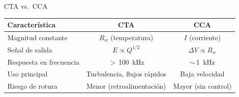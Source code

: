 \documentclass[aspectratio=169,12pt]{beamer}
\begin{document}
\begin{frame}{CTA vs.\ CCA}
	\centering
	\small
	\begin{tabular}{lcc}
		\toprule
		\textbf{Característica} & \textbf{CTA}
		                        & \textbf{CCA}                  \\
		\midrule
		Magnitud constante      & $R_w$ (temperatura)
		                        & $I$ (corriente)               \\
		Señal de salida         & $E \propto Q^{1/2}$
		                        & $\Delta V \propto R_w$        \\
		Respuesta en frecuencia & $>$\,\SI{100}{\kilo\hertz}
		                        & ${\sim}$\,\SI{1}{\kilo\hertz} \\
		Uso principal           & Turbulencia, flujos rápidos
		                        & Baja velocidad                \\
		Riesgo de rotura        & Menor (retroalimentación)
		                        & Mayor (sin control)           \\
		\bottomrule
	\end{tabular}

	\vspace{0.5cm}
\end{frame}
\end{document}
